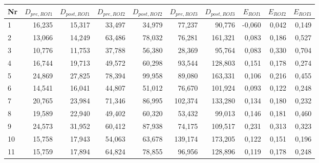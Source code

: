 \begin{center}
    \centering
    \begin{tabular}{lrrrrrrrrr}
        \toprule
        Nr &   $D_{pre,ROI1}$ &  $D_{post,ROI1}$ &   $D_{pre,ROI2}$ &  $D_{post,ROI2}$ &    $D_{pre,ROI3}$ &   $D_{post,ROI3}$ &     $E_{ROI1}$ &    $E_{ROI2}$ &    $E_{ROI3}$ \\
        \midrule
        1  & 16,235 & 15,317 & 33,497 & 34,979 &  77,237 &  90,776 & -0,060 & 0,042 & 0,149 \\
        2  & 13,066 & 14,249 & 63,486 & 78,032 &  76,281 & 161,321 &  0,083 & 0,186 & 0,527 \\
        3  & 10,776 & 11,753 & 37,788 & 56,380 &  28,369 &  95,764 &  0,083 & 0,330 & 0,704 \\
        4  & 16,744 & 19,713 & 49,572 & 60,298 &  93,544 & 128,803 &  0,151 & 0,178 & 0,274 \\
        5  & 24,869 & 27,825 & 78,394 & 99,958 &  89,080 & 163,331 &  0,106 & 0,216 & 0,455 \\
        6 & 14,541 & 16,041 & 44,807 & 51,012 &  76,670 & 101,924 &  0,093 & 0,122 & 0,248 \\
        7 & 20,765 & 23,984 & 71,346 & 86,995 & 102,374 & 133,280 &  0,134 & 0,180 & 0,232 \\
        8 & 19,589 & 22,940 & 49,402 & 60,320 &  53,432 &  99,013 &  0,146 & 0,181 & 0,460 \\
        9 & 24,573 & 31,952 & 60,412 & 87,938 &  74,175 & 109,517 &  0,231 & 0,313 & 0,323 \\
        10 & 15,758 & 17,943 & 54,063 & 63,678 & 139,174 & 173,205 &  0,122 & 0,151 & 0,196 \\
        11 & 15,759 & 17,894 & 64,824 & 78,855 &  96,956 & 128,896 &  0,119 & 0,178 & 0,248 \\
        \bottomrule
    \end{tabular}
    \label{tab:bleach}
\end{center}

